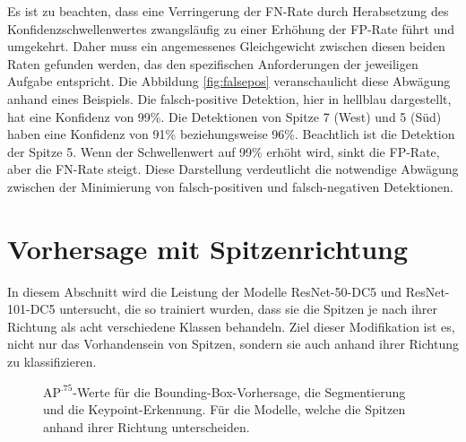 Es ist zu beachten, dass eine Verringerung der FN-Rate durch Herabsetzung des Konfidenzschwellenwertes zwangsläufig zu einer Erhöhung der FP-Rate führt und umgekehrt. Daher muss ein angemessenes Gleichgewicht zwischen diesen beiden Raten gefunden werden, das den spezifischen Anforderungen der jeweiligen Aufgabe entspricht.
Die Abbildung \ref{fig:falsepos} veranschaulicht diese Abwägung anhand eines Beispiels. Die falsch-positive Detektion, hier in hellblau dargestellt, hat eine Konfidenz von 99\%. Die Detektionen von Spitze 7 (West) und 5 (Süd) haben eine Konfidenz von 91\% beziehungsweise 96\%. Beachtlich ist die Detektion
der Spitze 5. Wenn der Schwellenwert auf 99\% erhöht wird, sinkt die FP-Rate, aber die FN-Rate steigt. Diese Darstellung verdeutlicht die notwendige Abwägung zwischen der Minimierung von falsch-positiven und falsch-negativen Detektionen.
\section{Vorhersage mit Spitzenrichtung}
In diesem Abschnitt wird die Leistung der Modelle ResNet-50-DC5 und ResNet-101-DC5 untersucht, die so trainiert wurden, dass sie die Spitzen je nach ihrer Richtung als acht verschiedene Klassen behandeln. Ziel dieser Modifikation ist es, nicht nur das Vorhandensein von Spitzen, sondern sie auch anhand ihrer Richtung zu klassifizieren.

\begin{figure}[h]
    \centering
    \caption{$\text{AP}^{.75}$-Werte für die Bounding-Box-Vorhersage, die Segmentierung und die Keypoint-Erkennung. Für die Modelle, welche die Spitzen anhand ihrer Richtung unterscheiden.}
    \label{fig:ap75-mc}
\end{figure}

